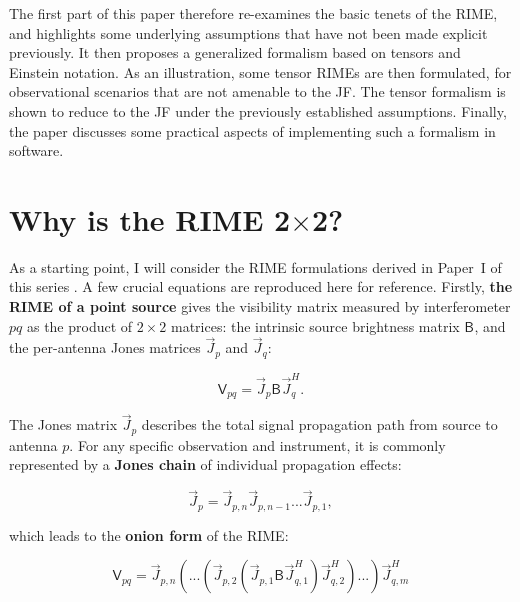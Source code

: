 \documentclass{aa}
\newcommand{\herm}{H}
\newcommand{\jones}[2]{\vec {#1}_{#2}}
\newcommand{\jonesT}[2]{\vec {#1}^{\herm}_{#2}}
\newcommand{\coh}[2]{\mathsf{{#1}}_{{#2}}}
\begin{document}
The first part of this paper therefore re-examines the basic tenets of the RIME, and highlights some underlying assumptions that have not been made explicit previously. It then proposes a generalized formalism based on tensors and Einstein notation. As an illustration, some tensor RIMEs are then formulated, for observational scenarios that are not amenable to the JF. The tensor formalism is shown to reduce to the JF under the previously established assumptions. Finally, the paper discusses some practical aspects of implementing such a formalism in software.

\section{Why is the RIME 2$\times$2?}
\label{sec:2x2}

As a starting point, I will consider the RIME formulations derived in Paper~I of this series \citep{RRIME1}. A few crucial equations are reproduced here for reference. Firstly, {\bf the RIME of a point source} gives the visibility matrix measured by interferometer $pq$ as the product of $2\times2$ matrices: the intrinsic source brightness matrix $\coh{B}{}$, and the per-antenna Jones matrices $\jones{J}{p}$ and $\jones{J}{q}$:

\begin{equation}
  \label{eq:rime-ps}
    \coh{V}{pq} = \jones{J}{p} \coh{B}{}  \jonesT{J}{q}.
\end{equation}

The Jones matrix $\jones{J}{p}$ describes the total signal propagation path from source to antenna $p$. For any specific observation and instrument, it is commonly represented by a {\bf Jones chain} of individual propagation effects:

\begin{equation}
  \label{eq:jones-chain}
  \jones{J}{p} = \jones{J}{p,n} \jones{J}{p,n-1} ... \jones{J}{p,1},
\end{equation}

which leads to the {\bf onion form} of the RIME:

\begin{equation}
  \label{eq:rime-onion}
   \coh{V}{pq} = \jones{J}{p,n}(...(\jones{J}{p,2} (\jones{J}{p,1} \coh{B}{}  \jones{J}{q,1}^\herm)\jonesT{J}{q,2}) ... )\jonesT{J}{q,m}
\end{equation}
\end{document}
